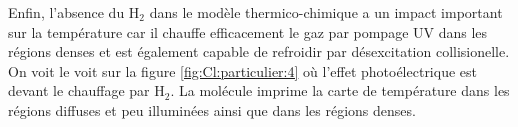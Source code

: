 Enfin, l'absence du $\mathrm{H}_2$ dans le modèle thermico-chimique a un impact important sur la température car il chauffe efficacement le gaz par pompage UV dans les régions denses et est également capable de refroidir par désexcitation collisionelle. On voit le voit sur la figure \ref{fig:Cl:particulier:4} où l'effet photoélectrique est devant le chauffage par $\mathrm{H}_2$. La molécule imprime la carte de température dans les régions diffuses et peu illuminées ainsi que dans les régions denses. 




